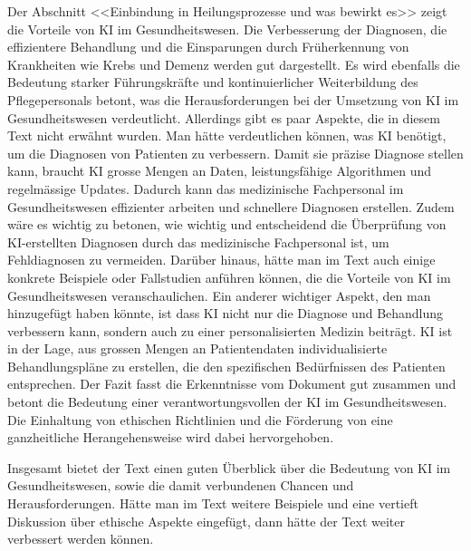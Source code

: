 \documentclass{article}
\begin{document}
{\begin{itemize}
Der Abschnitt <<Einbindung in Heilungsprozesse und was bewirkt es>> zeigt die Vorteile von KI
im Gesundheitswesen. Die Verbesserung der Diagnosen, die effizientere Behandlung und die Einsparungen
durch Früherkennung von Krankheiten wie Krebs und Demenz werden gut dargestellt. Es wird ebenfalls die Bedeutung starker 
Führungskräfte und kontinuierlicher Weiterbildung des Pflegepersonals betont, was die Herausforderungen bei der Umsetzung
von KI im Gesundheitswesen verdeutlicht. Allerdings gibt es paar Aspekte, die in diesem Text nicht erwähnt wurden.
Man hätte verdeutlichen können, was KI benötigt, um die Diagnosen von Patienten zu verbessern. Damit sie präzise Diagnose stellen kann, 
braucht KI grosse Mengen an Daten, leistungsfähige Algorithmen und regelmässige Updates. Dadurch kann das medizinische Fachpersonal im Gesundheitswesen
effizienter arbeiten und schnellere Diagnosen erstellen. Zudem wäre es wichtig zu betonen, wie wichtig und entscheidend die Überprüfung von KI-erstellten Diagnosen
durch das medizinische Fachpersonal ist, um Fehldiagnosen zu vermeiden.  
Darüber hinaus, hätte man im Text auch einige konkrete Beispiele oder Fallstudien anführen können, die die Vorteile von KI im Gesundheitswesen
veranschaulichen. Ein anderer wichtiger Aspekt, den man hinzugefügt haben könnte, ist dass KI nicht nur die Diagnose und Behandlung verbessern kann, sondern
auch zu einer personalisierten Medizin beiträgt. KI ist in der Lage, aus grossen Mengen an Patientendaten individualisierte Behandlungspläne zu erstellen,
die den spezifischen Bedürfnissen des Patienten entsprechen. \citep{clutch}
Der Fazit fasst die Erkenntnisse vom Dokument gut zusammen und betont die Bedeutung einer verantwortungsvollen der KI im Gesundheitswesen. Die Einhaltung von ethischen Richtlinien und die Förderung
 von eine ganzheitliche Herangehensweise wird dabei hervorgehoben. 


\end{itemize}

\newpage

Insgesamt bietet der Text einen guten Überblick über die Bedeutung von KI im Gesundheitswesen, sowie die damit verbundenen Chancen und Herausforderungen.
Hätte man im Text weitere Beispiele und eine vertieft Diskussion über ethische Aspekte eingefügt, dann hätte der Text weiter verbessert werden können. 




}





\printbibliography
\end{document}
